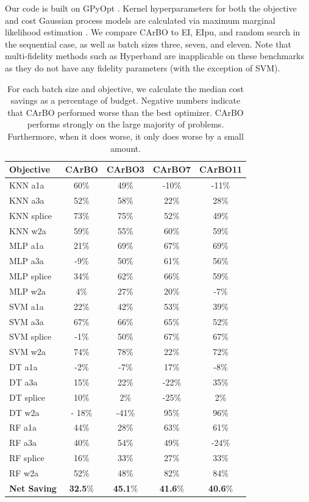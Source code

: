 \documentclass{article}
\begin{document}
Our code is built on GPyOpt \cite{gpyopt2016}. Kernel hyperparameters for both the objective and cost Gaussian process models are calculated via maximum marginal likelihood estimation \cite{rasmussen2006gaussian}. We compare CArBO to EI, EIpu, and random search in the sequential case, as well as batch sizes three, seven, and eleven. Note that multi-fidelity methods such as Hyperband are inapplicable on these benchmarks as they do not have any fidelity parameters (with the exception of SVM). 

\begin{table}[t]
\centering
\scriptsize
\setlength\tabcolsep{4pt}
\begin{tabular}{| l  c c c c |}
\hline
Objective & CArBO & CArBO3 & CArBO7 & CArBO11 \\
\hline \hline
KNN a1a &     60\% &  49\% & -10\% & -11\% \\ \hline		
KNN a3a &     52\% &  58\% &  22\% &  28\% \\ \hline
KNN splice &  73\% &  75\% &  52\% &  49\% \\ \hline
KNN w2a &     59\% &  55\% &  60\% &  59\% \\ \hline
MLP a1a &     21\% &  69\% &  67\% &  69\% \\ \hline
MLP a3a &     -9\% &  50\% &  61\% &  56\% \\ \hline
MLP splice &  34\% &  62\% &  66\% &  59\% \\ \hline
MLP w2a &     4\%  &  27\% &  20\% &  -7\% \\ \hline
SVM a1a &     22\% &  42\% &  53\% &  39\% \\ \hline
SVM a3a &     67\% &  66\% &  65\% &  52\% \\ \hline
SVM splice &  -1\% &  50\% &  67\% &  67\% \\ \hline
SVM w2a &     74\% &  78\% &  22\% &  72\% \\ \hline
DT a1a &      -2\% &  -7\% &  17\% &  -8\% \\ \hline
DT a3a &      15\% &  22\% & -22\% &  35\% \\ \hline
DT splice &   10\% &   2\% & -25\% &   2\% \\ \hline
DT w2a & -    18\% & -41\% &  95\% &  96\% \\ \hline
RF a1a &      44\% &  28\% &  63\% &  61\% \\ \hline
RF a3a &      40\% &  54\% &  49\% & -24\% \\ \hline
RF splice &   16\% &  33\% &  27\% &  33\% \\ \hline
RF w2a &      52\% &  48\% &  82\% &  84\% \\ \hline
\textbf{Net Saving} &      \textbf{32.5}\% &  \textbf{45.1}\% &  \textbf{41.6}\% &  \textbf{40.6}\% \\
\hline
\end{tabular}
\caption{For each batch size and objective, we calculate the median cost savings as a percentage of budget. Negative numbers indicate that CArBO performed worse than the best optimizer. CArBO performs strongly on the large majority of problems. Furthermore, when it does worse, it only does worse by a small amount.} \label{tab:percentage_savings}
\end{table}
\end{document}
